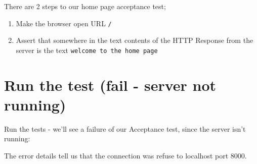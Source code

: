 \documentclass[a4paperpaper,openright]{book}
\newenvironment{Shaded}{}{}
\newcommand{\ExtensionTok}[1]{#1}
\newcommand{\NormalTok}[1]{#1}
\begin{document}
There are 2 steps to our home page acceptance test;

\begin{enumerate}
\def\labelenumi{\arabic{enumi}.}
\item
  Make the browser open URL \texttt{/}
\item
  Assert that somewhere in the text contents of the HTTP Response from
  the server is the text \texttt{welcome\ to\ the\ home\ page}
\end{enumerate}

\hypertarget{run-the-test-fail---server-not-running}{%
\section{Run the test (fail - server not
running)}\label{run-the-test-fail---server-not-running}}

Run the tests - we'll see a failure of our Acceptance test, since the
server isn't running:

\begin{Shaded}
\end{Shaded}

The error details tell us that the connection was refuse to localhost
port 8000.
\end{document}
